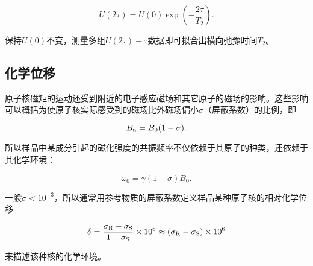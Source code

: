 \begin{equation}
U(2\tau)=U(0)\exp{\left(-\dfrac{2\tau}{T_2}\right)}.
\end{equation}

保持\(U(0)\)不变，测量多组\(U(2\tau)-\tau\)数据即可拟合出横向弛豫时间\(T_2\)。

\subsection{化学位移}\label{ux5316ux5b66ux4f4dux79fb}

原子核磁矩的运动还受到附近的电子感应磁场和其它原子的磁场的影响。这些影响可以概括为使原子核实际感受到的磁场比外磁场偏小\(\sigma\)（屏蔽系数）的比例，即

\begin{equation}
B_{\rm n}=B_0(1-\sigma).
\end{equation}

所以样品中某成分引起的磁化强度的共振频率不仅依赖于其原子的种类，还依赖于其化学环境：

\begin{equation}
\omega_0=\gamma(1-\sigma)B_0.
\end{equation}

一般\(\sigma\widetilde{<}10^{-3}\)，所以通常用参考物质的屏蔽系数定义样品某种原子核的相对化学位移

\begin{equation}
\delta=\dfrac{\sigma_{\rm R}-\sigma_{\rm S}}{1-\sigma_{\rm S}}\times10^{6}\approx{(\sigma_{\rm R}-\sigma_{\rm S})}\times10^{6}
\end{equation}

来描述该种核的化学环境。

